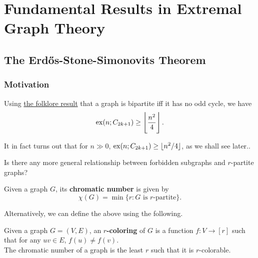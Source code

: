 \documentclass{article}
\begin{document}
\thispagestyle{empty}

\titleBC
\tableofcontents
\clearpage

\setcounter{section}{-1}




\section{Fundamental Results in Extremal Graph Theory}


	\subsection{The Erd\H{o}s-Stone-Simonovits Theorem}

		\subsubsection{Motivation}

			Using \href{https://proofwiki.org/wiki/Graph_is_Bipartite_iff_No_Odd_Cycles}{the folklore result} that a graph is bipartite iff it has no odd cycle, we have
			\[ \operatorname{ex}(n;C_{2k+1}) \ge \left\lfloor \frac{n^2}{4} \right\rfloor. \]
			\begin{remark}
				It in fact turns out that for $n\gg 0$, $\operatorname{ex}(n;C_{2k+1}) \ge \lfloor n^2/4 \rfloor$, as we shall see later..
			\end{remark}

			Is there any more general relationship between forbidden subgraphs and $r$-partite graphs?

			\begin{fdef}
				\label{def: chromatic number}
				Given a graph $G$, its \textbf{chromatic number} is given by
				\[ \chi(G) = \min\{r : G\text{ is $r$-partite}\}. \]
			\end{fdef}

			Alternatively, we can define the above using the following.

			\begin{fdef}
				\label{def: r-coloring}
				Given a graph $G=(V,E)$, an \textbf{$r$-coloring} of $G$ is a function $f : V \to [r]$ such that for any $uv\in E$, $f(u) \ne f(v)$.\\
				The chromatic number of a graph is the least $r$ such that it is $r$-colorable.
			\end{fdef}
\end{document}
